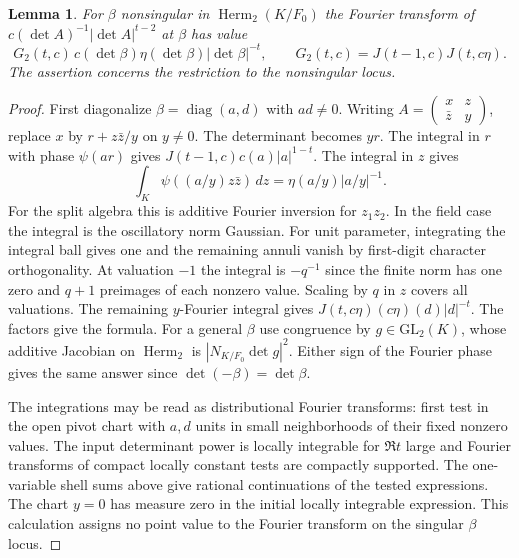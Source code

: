 \documentclass[11pt]{article}
\newtheorem{lemma}[theorem]{Lemma}
\begin{document}
\begin{lemma}
For $\beta$ nonsingular in $\operatorname{Herm}_2(K/F_0)$ the Fourier
transform of $c(\det A)^{-1}|\det A|^{t-2}$ at $\beta$ has value
\[
 G_2(t,c)\,c(\det\beta)\eta(\det\beta)|\det\beta|^{-t},
 \qquad G_2(t,c)=J(t-1,c)J(t,c\eta).
\]
The assertion concerns the restriction to the nonsingular locus.
\end{lemma}
\begin{proof}
First diagonalize $\beta=\operatorname{diag}(a,d)$ with $ad\ne0$.
Writing $A=\left(\begin{smallmatrix}x&z\\\bar z&y\end{smallmatrix}\right)$,
replace $x$ by $r+z\bar z/y$ on $y\ne0$. The determinant becomes $yr$.
The integral in $r$ with phase $\psi(ar)$ gives
$J(t-1,c)c(a)|a|^{1-t}$. The integral in $z$ gives
\[
 \int_K\psi((a/y) z\bar z)\,dz=\eta(a/y)|a/y|^{-1}.
\]
For the split algebra this is additive Fourier inversion for $z_1z_2$.
In the field case the integral is the oscillatory norm Gaussian. For
unit parameter, integrating the integral ball gives one and the
remaining annuli vanish by first-digit character orthogonality. At
valuation $-1$ the integral is $-q^{-1}$ since the finite norm has
one zero and $q+1$ preimages of each nonzero value. Scaling by $q$
in $z$ covers all valuations. The remaining $y$-Fourier integral
gives $J(t,c\eta)(c\eta)(d)|d|^{-t}$. The factors give the formula.
For a general $\beta$ use congruence by $g\in\mathrm{GL}_2(K)$,
whose additive Jacobian on $\operatorname{Herm}_2$ is
$|N_{K/F_0}\det g|^2$. Either sign of the Fourier phase gives the same
answer since $\det(-\beta)=\det\beta$.

The integrations may be read as distributional Fourier transforms:
first test in the open pivot chart with $a,d$ units in small
neighborhoods of their fixed nonzero values. The input determinant
power is locally integrable for $\Re t$ large and Fourier transforms
of compact locally constant tests are compactly supported. The
one-variable shell sums above give rational continuations of the
tested expressions. The chart $y=0$ has measure zero in the initial
locally integrable expression. This calculation assigns no point value
to the Fourier transform on the singular $\beta$ locus.
\end{proof}
\end{document}
